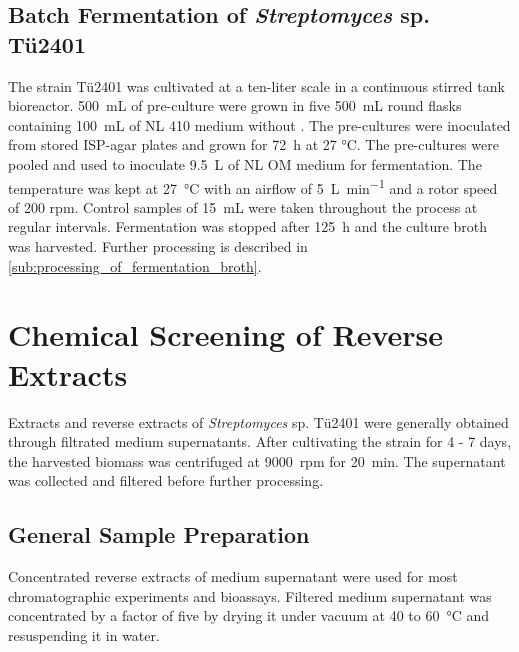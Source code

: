 	\subsection{Batch Fermentation of \emph{Streptomyces} sp. Tü2401} %
	\label{sub:fermentation}
	The strain T\"u2401 was cultivated at a ten-liter scale in a continuous stirred tank bioreactor. \SI{500}{\milli\liter} of pre-culture were grown in five \SI{500}{\milli\liter} round flasks containing \SI{100}{\milli\liter} of NL 410 medium without . The pre-cultures were inoculated from stored ISP-agar plates and grown for \SI{72}{\hour} at 27 \si{\celsius}. The pre-cultures were pooled and used to inoculate \SI{9.5}{\liter} of NL OM medium for fermentation. The temperature was kept at \SI{27}{\celsius} with an airflow of \SI{5}{\liter\per\minute} and a rotor speed of 200 rpm. Control samples of \SI{15}{\milli\liter} were taken throughout the process at regular intervals. Fermentation was stopped after \SI{125}{\hour} and the culture broth was harvested. Further processing is described in \ref{sub:processing_of_fermentation_broth}.



\clearpage

\section{Chemical Screening of Reverse Extracts} %
\label{sec:chemical_screening_of_reverse_extracts}

Extracts and reverse extracts of \emph{Streptomyces} sp. Tü2401 were generally obtained through filtrated medium supernatants. After  cultivating the strain for 4 - 7 days, the harvested biomass was centrifuged at 9000~rpm for \SI{20}{\minute}. The supernatant was collected and filtered before further processing.

	\subsection{General Sample Preparation} %
	\label{sub:general_sample_preparation}

	Concentrated reverse extracts of medium supernatant were used for most chromatographic experiments and bioassays. Filtered medium supernatant was concentrated by a factor of five by drying it under vacuum at 40 to \SI{60}{\celsius} and resuspending it in water.

